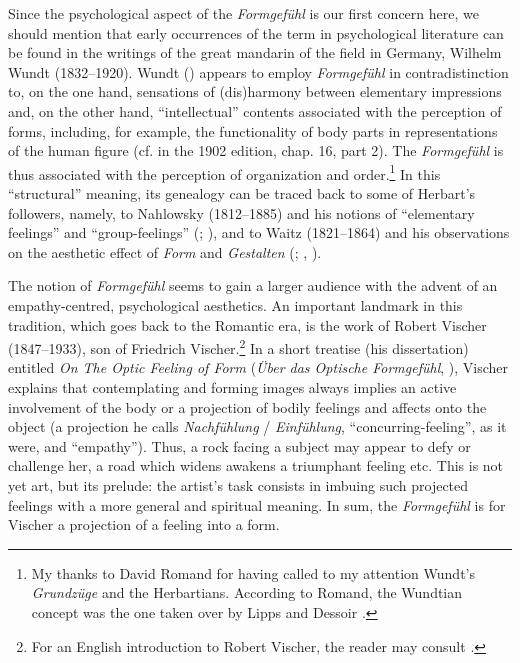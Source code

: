 \documentclass[output=paper]{langscibook}
\begin{document}
Since the psychological aspect of the \emph{Formgefühl} is our first concern here, we should mention that early occurrences of the term in psychological literature can be found in the writings of the great mandarin of the field in Germany, Wilhelm Wundt (1832--1920). Wundt (\citet{Wundt1874}) appears to employ \emph{Formgefühl} in contradistinction to, on the one hand, sensations of (dis)harmony between elementary impressions and, on the other hand, ``intellectual'' contents associated with the perception of forms, including, for example, the functionality of body parts in representations of the human figure (cf. in the 1902 edition, chap. 16, part 2). The \emph{Formgefühl} is thus associated with the perception of organization and order.\footnote{My thanks to David Romand for having called to my attention Wundt’s \emph{Grundzüge} and the Herbartians. According to Romand, the Wundtian concept was the one taken over by Lipps and Dessoir \citep{RomandIP}.} In this ``structural'' meaning, its genealogy can be traced back to some of Herbart's followers, namely, to Nahlowsky (1812--1885) and his notions of ``elementary feelings'' and ``group-feelings'' (\citealt{Nahlowsky1862}; \citealt{Romand2018}), and to Waitz (1821--1864) and his observations on the aesthetic effect of \emph{Form} and \emph{Gestalten} (\citealt{Waitz1849}; \citealt{Romand2015}, \citealt{RomandIP}).

The notion of \emph{Formgefühl} seems to gain a larger audience with the advent of an empathy-centred, psychological aesthetics. An important landmark in this tradition, which goes back to the Romantic era, is the work of Robert Vischer (1847--1933), son of Friedrich Vischer.\footnote{For an English introduction to Robert Vischer, the reader may consult \citet{Barasch1989}.} In a short treatise (his dissertation) entitled \emph{On The Optic Feeling of Form} (\emph{Über das Optische Formgefühl}, \citeyear{Vischer1873}), Vischer explains that contemplating and forming images always implies an active involvement of the body or a projection of bodily feelings and affects onto the object (a projection he calls \emph{Nachfühlung} / \emph{Einfühlung}, ``concurring-feeling'', as it were, and ``empathy''). Thus, a rock facing a subject may appear to defy or challenge her, a road which widens awakens a triumphant feeling etc. This is not yet art, but its prelude: the artist's task consists in imbuing such projected feelings with a more general and spiritual meaning. In sum, the \emph{Formgefühl} is for Vischer a projection of a feeling into a form.
\end{document}
